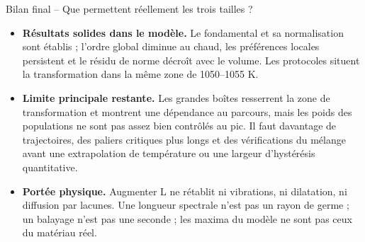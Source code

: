 \begin{oral}{Bilan final -- Que permettent réellement les trois tailles ?}

\begin{itemize}

\item \textbf{Résultats solides dans le modèle.} Le fondamental et sa normalisation sont établis ; l’ordre global diminue au chaud, les préférences locales persistent et le résidu de norme décroît avec le volume. Les protocoles situent la transformation dans la même zone de 1050--1055 K.

\item \textbf{Limite principale restante.} Les grandes boîtes resserrent la zone de transformation et montrent une dépendance au parcours, mais les poids des populations ne sont pas assez bien contrôlés au pic. Il faut davantage de trajectoires, des paliers critiques plus longs et des vérifications du mélange avant une extrapolation de température ou une largeur d’hystérésis quantitative.

\item \textbf{Portée physique.} Augmenter L ne rétablit ni vibrations, ni dilatation, ni diffusion par lacunes. Une longueur spectrale n’est pas un rayon de germe ; un balayage n’est pas une seconde ; les maxima du modèle ne sont pas ceux du matériau réel.

\end{itemize}\end{oral}
